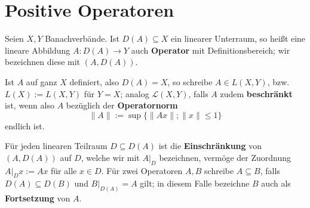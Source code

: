 



\section{Positive Operatoren}

\par
Seien $X, Y$ Banachverbände. Ist $D(A)\subseteq X$ ein linearer Unterraum, so heißt eine lineare Abbildung $A\colon D(A)\to Y$ auch \textbf{Operator} mit Definitionsbereich; wir bezeichnen diese mit $(A, D(A))$. 


Ist $A$ auf ganz $X$ definiert, also $D(A)=X$, so schreibe $A\in L(X, Y)$, bzw. $L(X):= L(X,Y)$ für $Y=X$; analog $\mathcal L(X,Y)$, falls $A$ zudem \textbf{beschränkt} ist, wenn also $A$ bezüglich der \textbf{Operatornorm} 
\begin{equation*}\label{eq:}
\|A\|:=\sup\big\{\|Ax\|;\|x\|\leq 1\big\}
\end{equation*}
endlich ist. 

\par
Für jeden linearen Teilraum $D\subseteq D(A)$ ist die \textbf{Einschränkung} von $(A, D(A))$ auf $D$, welche wir mit $A|_D$ bezeichnen, vermöge der Zuordnung $A|_D x:= Ax$ für alle $x\in D$. Für zwei Operatoren $A,B$ schreibe $A\subseteq B$, falls $D(A)\subseteq D(B)$  und $B|_{D(A)}=A$ gilt; in diesem Falle bezeichne $B$ auch als \textbf{Fortsetzung} von $A$. 

